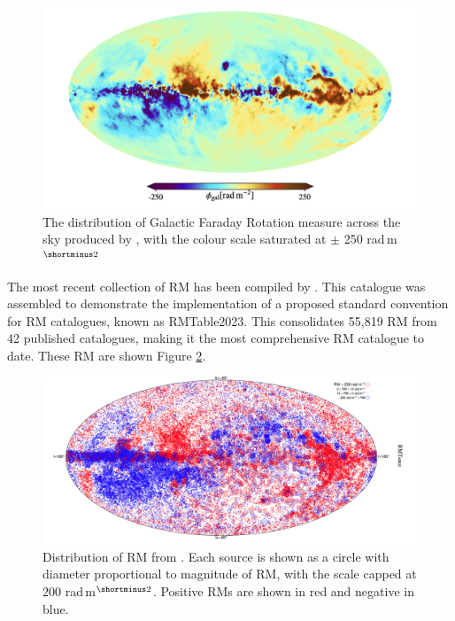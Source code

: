 \begin{figure}
    \centering
    \includegraphics[width=\linewidth]{Thesis_Template/Figures/Hutschenreuter2020.png}
    \caption[Galactic Faraday Rotation measure distribution from \cite{Hutschenreuter_2020}]{The distribution of Galactic Faraday Rotation measure across the sky produced by \cite{Hutschenreuter_2020}, with the colour scale saturated at $\pm$ 250 rad$\,$m$^{\shortminus2}$}
    \label{fig: Hutschenreuter 2020}
\end{figure}

The most recent collection of RM has been compiled by \cite{vanEck_2023}. This catalogue was assembled to demonstrate the implementation of a proposed standard convention for RM catalogues, known as RMTable2023. This consolidates 55,819 RM from 42 published catalogues, making it the most comprehensive RM catalogue to date. These RM are shown Figure \ref{fig:van eck map}.

\begin{figure}
    \centering
    \includegraphics[width=\linewidth]{Thesis_Template/Figures/van eck map.png}
    \caption[Galactic Faraday Rotation measure distribution from \cite{vanEck_2023}]{Distribution of RM from \cite{vanEck_2023}. Each source is shown as a circle with diameter proportional to magnitude of RM, with the scale capped at 200 rad$\,$m$^{\shortminus2}$. Positive RMs are shown in red and negative in blue.}
    \label{fig:van eck map}
\end{figure}

